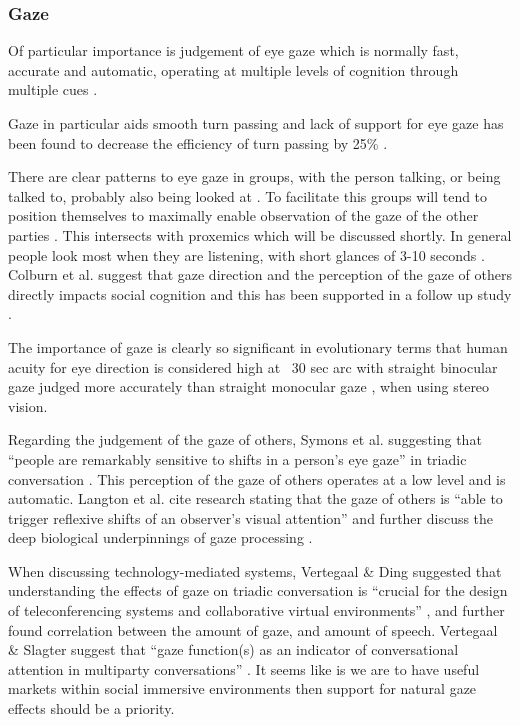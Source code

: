 \subsubsection{Gaze}
Of particular importance is judgement of eye gaze which is normally fast, accurate and automatic, operating at multiple levels of cognition through multiple cues \cite{Argyle1988,Argyle1976,Argyle1965,Argyle1976,Argyle1969, Kendon1967,Monk2002}.\par
Gaze in particular aids smooth turn passing \cite{Hedge1978} \cite{Novick1996} and lack of support for eye gaze has been found to decrease the efficiency of turn passing by 25\% \cite{Vertegaal2000}.\par
There are clear patterns to eye gaze in groups, with the person talking, or being talked to, probably also being looked at \cite{Vertegaal2001} \cite{Langton2000}. To facilitate this groups will tend to position themselves to maximally enable observation of the gaze of the other parties \cite{Kendon1967}. This intersects with proxemics which will be discussed shortly.  In general people look most when they are listening, with short glances of 3-10 seconds \cite{Argyle1965}. %
Colburn et al. suggest that gaze direction and the perception of the gaze of others directly impacts social cognition \cite{Colburn2000} and this has been supported in a follow up study \cite{Macrae2002}.\par
The importance of gaze is clearly so significant in evolutionary terms that human acuity for eye direction is considered high at ~30 sec arc \cite{Symons2004} with straight binocular gaze judged more accurately than straight monocular gaze \cite{Kluttz2009}, when using stereo vision. \par
Regarding the judgement of the gaze of others, Symons et al. suggesting that ``people are remarkably sensitive to shifts in a person's eye gaze'' in triadic conversation \cite{Symons2004}. 
This perception of the gaze of others operates at a low level and is automatic. Langton et al. cite research stating that the gaze of others is ``able to trigger reflexive shifts of an observer's visual attention'' and further discuss the deep biological underpinnings of gaze processing \cite{Langton2000}. \par  
When discussing technology-mediated systems, Vertegaal \& Ding suggested that understanding the effects of gaze on triadic conversation is ``crucial for the design of teleconferencing systems and collaborative virtual environments'' \cite{Vertegaal2002}, and further found correlation between the amount of gaze, and amount of speech. Vertegaal \& Slagter suggest that ``gaze function(s) as an indicator of conversational attention in multiparty conversations'' \cite{Vertegaal2001}. It seems like is we are to have useful markets within social immersive environments then support for natural gaze effects should be a priority.\par  
